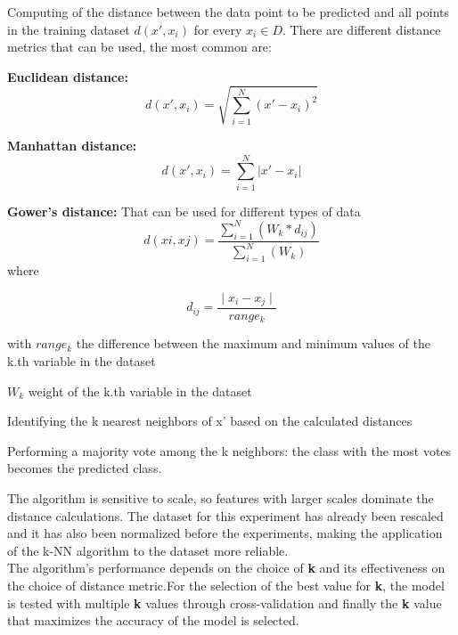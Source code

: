 \documentclass[11pt,a4paper]{article}
\newcommand{\SubItem}[1]{
  {\setlength\itemindent{13pt} \item[◦] #1}
}
\newcommand{\SubSubItem}[1]{
  {\setlength\itemindent{26pt} \item[◦] #1}
}
\begin{document}
\begin{itemize}
\item Computing of the distance between the data point to be predicted and all points in the training dataset $d(x',x_i)$ for every $x_i \in D$. There are different distance metrics that can be used, the most common are:
\SubItem{\textbf{Euclidean distance:}
\begin{displaymath}
d( x' , x_i ) = \sqrt{ \sum_{i=1}^{N} (x'  - x_i)^2}
\end{displaymath}}
\SubItem{\textbf{Manhattan distance:} 
\begin{displaymath}
d( x' , x_i ) = \sum_{i=1}^{N} |x'  - x_i|
\end{displaymath}}
\SubItem{\textbf{Gower’s distance:}
That can be used for different types of data
\begin{displaymath}
d(xi,xj) = \frac{ \sum_{i=1}^{N} (W_k * d_{ij})} {\sum_{i=1}^{N} (W_k)}
\end{displaymath}
where }
\begin{displaymath}
d_{ij} = \frac{∣ x_i - x_j ∣}{range_k}  
\end{displaymath} 
\SubSubItem{with $range_k$ the difference between the maximum and minimum values of the k.th variable in the dataset}
\SubSubItem{$W_k$ weight of the k.th variable in the dataset}
\item Identifying the k nearest neighbors of x' based on the calculated distances
\item Performing a majority vote among the k neighbors: the class with the most votes becomes the predicted class.
\end{itemize}
The algorithm is sensitive to scale, so features with larger scales dominate the distance calculations. The dataset for this experiment has already been rescaled and it has also been normalized before the experiments, making the application of the k-NN algorithm to the dataset more reliable. \\
The algorithm's performance depends on the choice of \textbf{k} and its effectiveness on the choice of distance metric.For the selection of the best value for \textbf{k}, the model is tested with multiple \textbf{k} values through cross-validation and finally the \textbf{k} value that maximizes the accuracy of the model is selected.
\end{document}
